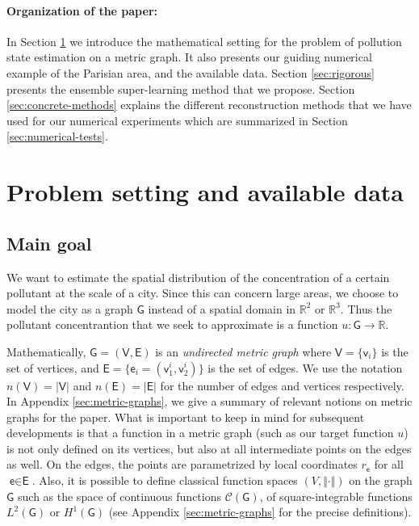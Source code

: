 \documentclass[11pt,a4paper,twoside]{article}
\theoremstyle{definition}
\numberwithin{equation}{section}
\newcommand{\cC}{\ensuremath{\mathcal{C}}}
\newcommand{\bR}{\ensuremath{\mathbb{R}}}
\newcommand{\G}{\ensuremath{\textsf{G}}} %
\newcommand{\E}{\ensuremath{\textsf{E}}} %
\newcommand{\V}{\ensuremath{\textsf{V}}} %
\newcommand{\vv}{\ensuremath{\textsf{v}}}
\newcommand{\ee}{\ensuremath{\textsf{e}}}
\newcommand{\<}{\langle}
\renewcommand{\>}{\rangle}
\newcommand{\om}[1]{\textcolor{blue}{#1}}
\begin{document}
\paragraph{Organization of the paper:} In Section \ref{sec:problem-setting} we introduce the mathematical setting for the problem of pollution state estimation on a metric graph. It also presents our guiding numerical example of the Parisian area, and the available data. Section \ref{sec:rigorous} presents the ensemble super-learning method that we propose. Section \ref{sec:concrete-methods} explains the different reconstruction methods that we have used for our numerical experiments which are summarized in Section \ref{sec:numerical-tests}. 





\section{Problem setting and available data}
\label{sec:problem-setting}

\subsection{Main goal}
\label{sec:loose}
We want to estimate the spatial distribution of the concentration of a certain pollutant at the scale of a city. Since this can concern large areas, we choose to model the city as a graph $\G$ instead of a spatial domain in $\bR^2$ or $\bR^3$. Thus the pollutant concentrantion that we seek to approximate is a function $u:\G\to \bR$.

Mathematically, $\G=(\V, \E)$ is an \emph{undirected metric graph} where $\V=\{\vv_i\}$ is the set of vertices, and $\E=\{\ee_i=(\vv_1^i, \vv_2^i) \}$ is the set of edges. We use the notation $n(\V) = |\V|$ and $n(\E)=|\E|$ for the number of edges and vertices respectively. In Appendix \ref{sec:metric-graphs}, we give a summary of relevant notions on metric graphs for the paper. What is important to keep in mind for subsequent developments is that a function in a metric graph (such as our target function $u$) is not only defined on its vertices, but also at all intermediate points on the edges as well. On the edges, the points are parametrized by local coordinates $r_\ee$ for all $\ee\in \E$. Also, it is possible to define classical function spaces $(V, \Vert \cdot \Vert)$ on the graph $\G$ such as the space of continuous functions $\cC(\G)$, of square-integrable functions $L^2(\G)$ or $H^1(\G)$ (see Appendix \ref{sec:metric-graphs} for the precise definitions).
\end{document}
